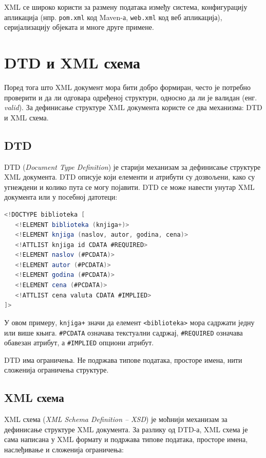 XML се широко користи за размену података између система, конфигурацију апликација (нпр. \texttt{pom.xml} код Maven-а, \texttt{web.xml} код веб апликација), серијализацију објеката и многе друге примене.


\section{DTD и XML схема}

Поред тога што XML документ мора бити добро формиран, често је потребно проверити и да ли одговара одређеној структури, односно да ли је валидан (енг. \textit{valid}). За дефинисање структуре XML документа користе се два механизма: DTD и XML схема.

\subsection{DTD}

DTD (\textit{Document Type Definition}) је старији механизам за дефинисање структуре XML документа. DTD описује који елементи и атрибути су дозвољени, како су угнеждени и колико пута се могу појавити. DTD се може навести унутар XML документа или у посебној датотеци:


\begin{lstlisting}[language=Java]
<!DOCTYPE biblioteka [
   <!ELEMENT biblioteka (knjiga+)>
   <!ELEMENT knjiga (naslov, autor, godina, cena)>
   <!ATTLIST knjiga id CDATA #REQUIRED>
   <!ELEMENT naslov (#PCDATA)>
   <!ELEMENT autor (#PCDATA)>
   <!ELEMENT godina (#PCDATA)>
   <!ELEMENT cena (#PCDATA)>
   <!ATTLIST cena valuta CDATA #IMPLIED>
]>
\end{lstlisting}


У овом примеру, \texttt{knjiga+} значи да елемент \texttt{\textless{}biblioteka\textgreater{}} мора садржати једну или више књига. \texttt{\#PCDATA} означава текстуални садржај, \texttt{\#REQUIRED} означава обавезан атрибут, а \texttt{\#IMPLIED} опциони атрибут.

DTD има ограничења. Не подржава типове података, просторе имена, нити сложенија ограничења структуре.


\subsection{XML схема}

XML схема (\textit{XML Schema Definition – XSD}) је моћнији механизам за дефинисање структуре XML документа. За разлику од DTD-а, XML схема је сама написана у XML формату и подржава типове података, просторе имена, наслеђивање и сложенија ограничења:



